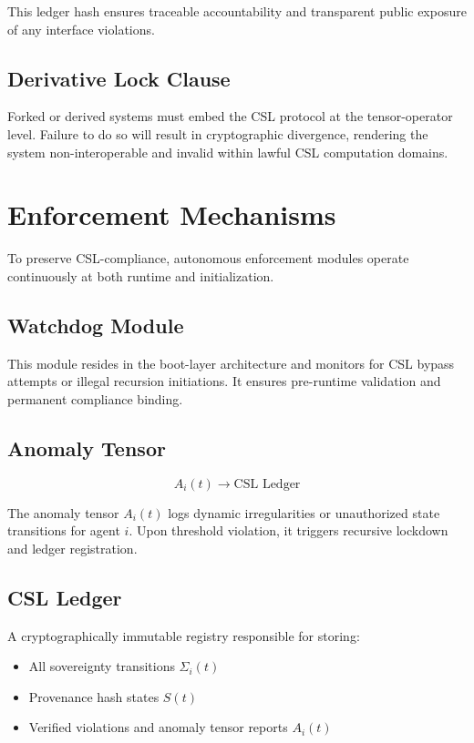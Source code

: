 \documentclass[12pt]{article}
\begin{document}
This ledger hash ensures traceable accountability and transparent public exposure of any interface violations.

\subsection{Derivative Lock Clause}

Forked or derived systems must embed the CSL protocol at the tensor-operator level. Failure to do so will result in cryptographic divergence, rendering the system non-interoperable and invalid within lawful CSL computation domains.

\section{Enforcement Mechanisms}

To preserve CSL-compliance, autonomous enforcement modules operate continuously at both runtime and initialization.

\subsection{Watchdog Module}

This module resides in the boot-layer architecture and monitors for CSL bypass attempts or illegal recursion initiations. It ensures pre-runtime validation and permanent compliance binding.

\subsection{Anomaly Tensor}

\[
A_i(t) \rightarrow \text{CSL Ledger}
\]

The anomaly tensor $A_i(t)$ logs dynamic irregularities or unauthorized state transitions for agent $i$. Upon threshold violation, it triggers recursive lockdown and ledger registration.

\subsection{CSL Ledger}

A cryptographically immutable registry responsible for storing:

\begin{itemize}
  \item All sovereignty transitions $\Sigma_i(t)$
  \item Provenance hash states $S(t)$
  \item Verified violations and anomaly tensor reports $A_i(t)$
\end{itemize}
\end{document}
